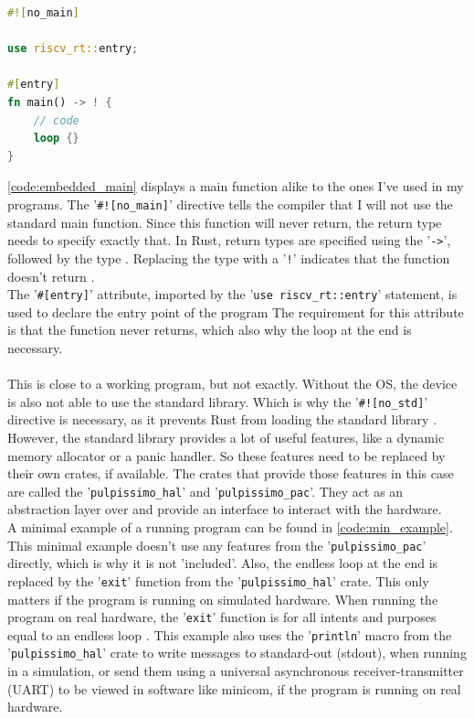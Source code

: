 \begin{lstlisting}[style=colorEX,language=Rust,caption={Example main function for the pulp-platform},label={code:embedded_main}]
#![no_main]

use riscv_rt::entry;

#[entry]
fn main() -> ! {
    // code
    loop {}
}
\end{lstlisting}

\ref{code:embedded_main} displays a main function alike to the ones I've used in my programs.
The '\lstinline{#![no_main]}' directive tells the compiler that I will not use the standard main function.
Since this function will never return, the return type needs to specify exactly that.
In Rust, return types are specified using the '\lstinline{->}', followed by the type \cite{rust_return}.
Replacing the type with a '\lstinline{!}' indicates that the function doesn't return \cite{rust_never_type}.
\\
The '\lstinline{#[entry]}' attribute, imported by the '\lstinline{use riscv_rt::entry}' statement, is used to declare the entry point of the program \cite{riscv_rt_entry}
The requirement for this attribute is that the function never returns, which also why the loop at the end is necessary.
\\\\
This is close to a working program, but not exactly.
Without the OS, the device is also not able to use the standard library.
Which is why the '\lstinline{#![no_std]}' directive is necessary, as it prevents Rust from loading the standard library \cite{rust_no_std}.
However, the standard library provides a lot of useful features, like a dynamic memory allocator or a panic handler.
So these features need to be replaced by their own crates, if available.
The crates that provide those features in this case are called the '\lstinline{pulpissimo_hal}' and '\lstinline{pulpissimo_pac}'.
They act as an abstraction layer over and provide an interface to interact with the hardware.
\\
A minimal example of a running program can be found in \ref{code:min_example}.
This minimal example doesn't use any features from the '\lstinline{pulpissimo_pac}' directly, which is why it is not 'included'.
Also, the endless loop at the end is replaced by the '\lstinline{exit}' function from the '\lstinline{pulpissimo_hal}' crate.
This only matters if the program is running on simulated hardware. When running the program on real hardware, the '\lstinline{exit}' function is
for all intents and purposes equal to an endless loop \cite[Ch 4.3.10]{rust_pulp}.
This example also uses the '\lstinline{println}' macro from the '\lstinline{pulpissimo_hal}' crate to write messages
to standard-out (stdout), when running in a simulation, or send them using a universal asynchronous receiver-transmitter (UART)
to be viewed in software like minicom, if the program is running on real hardware.

